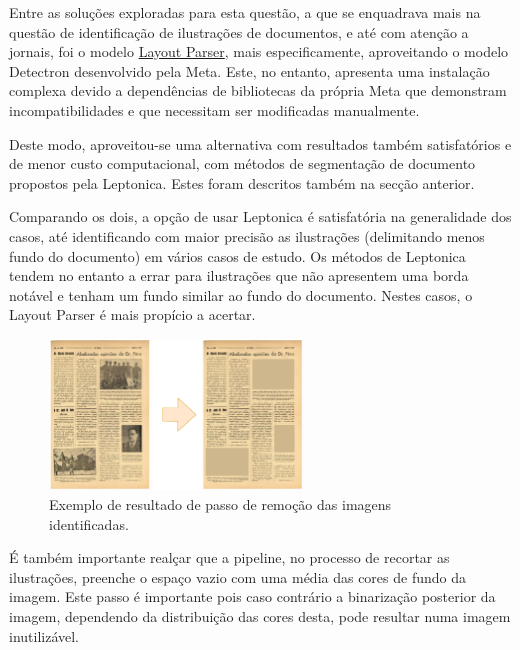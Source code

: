 Entre as soluções exploradas para esta questão, a que se enquadrava mais na questão de identificação de ilustrações de documentos, e até com atenção a jornais, foi o modelo \href{https://layout-parser.readthedocs.io/en/latest/index.html}{Layout Parser}, mais especificamente, aproveitando o modelo Detectron desenvolvido pela Meta.
Este, no entanto, apresenta uma instalação complexa devido a dependências de bibliotecas da própria Meta que demonstram incompatibilidades e que necessitam ser modificadas manualmente.

Deste modo, aproveitou-se uma alternativa com resultados também satisfatórios e de menor custo computacional, com métodos de segmentação de documento propostos pela Leptonica. Estes foram descritos também na secção anterior.

Comparando os dois, a opção de usar Leptonica é satisfatória na generalidade dos casos, até identificando com maior precisão as ilustrações (delimitando menos fundo do documento) em vários casos de estudo. Os métodos de Leptonica tendem no entanto a errar para ilustrações que não apresentem uma borda notável e tenham um fundo similar ao fundo do documento. Nestes casos, o Layout Parser é mais propício a acertar.

\begin{figure}[H]
	\centering
	\includegraphics[width=0.6\textwidth]{images/ilustracoes/remove_images_example.png}
	\caption{Exemplo de resultado de passo de remoção das imagens identificadas.}
	\label{fig:remove_images_example}
\end{figure}



É também importante realçar que a pipeline, no processo de recortar as ilustrações, preenche o espaço vazio com uma média das cores de fundo da imagem. Este passo é importante pois caso contrário a binarização posterior da imagem, dependendo da distribuição das cores desta, pode resultar numa imagem inutilizável.

